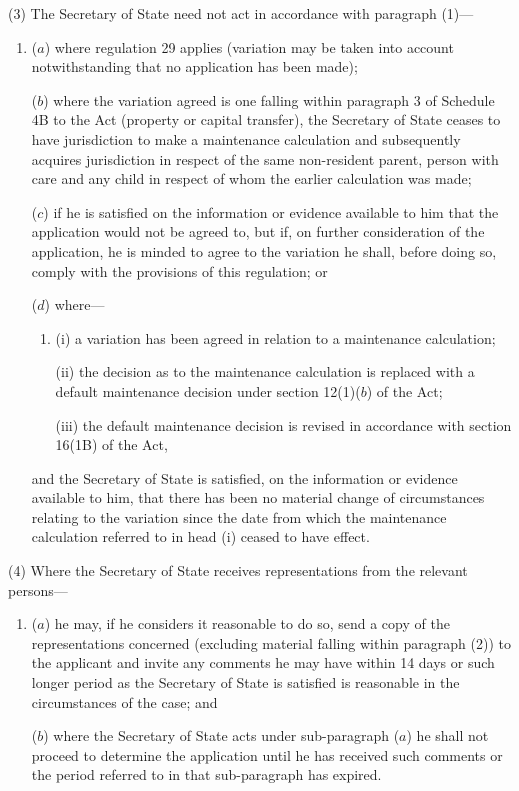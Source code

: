 \documentclass[12pt,a4paper]{article}
\begin{document}
(3) The Secretary of State need not act in accordance with paragraph (1)—
\begin{enumerate}\item[]
($a$) where regulation 29 applies (variation may be taken into account notwithstanding that no application has been made);

($b$) where the variation agreed is one falling within paragraph 3 of Schedule 4B to the Act (property or capital transfer), the Secretary of State ceases to have jurisdiction to make a maintenance calculation and subsequently acquires jurisdiction in respect of the same non-resident parent, person with care and any child in respect of whom the earlier calculation was made;

($c$) if he is satisfied on the information or evidence available to him that the application would not be agreed to, but if, on further consideration of the application, he is minded to agree to the variation he shall, before doing so, comply with the provisions of this regulation; or

($d$) where—
\begin{enumerate}\item[]
(i) a variation has been agreed in relation to a maintenance calculation;

(ii) the decision as to the maintenance calculation is replaced with a default maintenance decision under section 12(1)($b$)  of the Act;

(iii) the default maintenance decision is revised in accordance with section 16(1B) of the Act,
\end{enumerate}
and the Secretary of State is satisfied, on the information or evidence available to him, that there has been no material change of circumstances relating to the variation since the date from which the maintenance calculation referred to in head (i)  ceased to have effect.
\end{enumerate}

(4) Where the Secretary of State receives representations from the relevant persons—
\begin{enumerate}\item[]
($a$) he may, if he considers it reasonable to do so, send a copy of the representations concerned (excluding material falling within paragraph (2)) to the applicant and invite any comments he may have within 14 days or such longer period as the Secretary of State is satisfied is reasonable in the circumstances of the case; and

($b$) where the Secretary of State acts under sub-paragraph ($a$)  he shall not proceed to determine the application until he has received such comments or the period referred to in that sub-paragraph has expired.
\end{enumerate}
\end{document}
